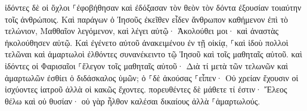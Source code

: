 \documentclass{openreader}
\begin{document}
ἰδόντες δὲ οἱ ὄχλοι ⸀ἐφοβήθησαν καὶ ἐδόξασαν τὸν θεὸν τὸν δόντα ἐξουσίαν τοιαύτην τοῖς ἀνθρώποις. 
Καὶ παράγων ὁ Ἰησοῦς ἐκεῖθεν εἶδεν ἄνθρωπον καθήμενον ἐπὶ τὸ τελώνιον, Μαθθαῖον λεγόμενον, καὶ λέγει αὐτῷ· Ἀκολούθει μοι· καὶ ἀναστὰς ἠκολούθησεν αὐτῷ. 
Καὶ ἐγένετο αὐτοῦ ἀνακειμένου ἐν τῇ οἰκίᾳ, ⸀καὶ ἰδοὺ πολλοὶ τελῶναι καὶ ἁμαρτωλοὶ ἐλθόντες συνανέκειντο τῷ Ἰησοῦ καὶ τοῖς μαθηταῖς αὐτοῦ. 
καὶ ἰδόντες οἱ Φαρισαῖοι ⸀ἔλεγον τοῖς μαθηταῖς αὐτοῦ· Διὰ τί μετὰ τῶν τελωνῶν καὶ ἁμαρτωλῶν ἐσθίει ὁ διδάσκαλος ὑμῶν; 
ὁ ⸀δὲ ἀκούσας ⸀εἶπεν· Οὐ χρείαν ἔχουσιν οἱ ἰσχύοντες ἰατροῦ ἀλλὰ οἱ κακῶς ἔχοντες. 
πορευθέντες δὲ μάθετε τί ἐστιν· Ἔλεος θέλω καὶ οὐ θυσίαν· οὐ γὰρ ἦλθον καλέσαι δικαίους ἀλλὰ ⸀ἁμαρτωλούς. 
\end{document}
